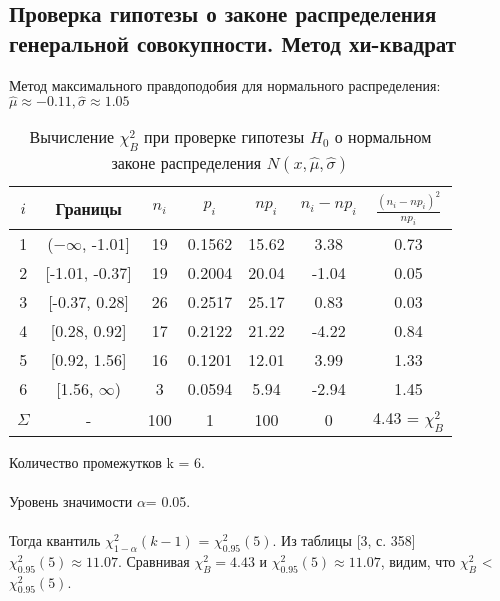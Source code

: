\documentclass[12pt,a4paper]{scrartcl}
\begin{document}
\subsection{Проверка гипотезы о законе распределения генеральной совокупности. Метод хи-квадрат}

	Метод максимального правдоподобия для нормального распределения:
	\newline
	$\hat{\mu} \approx -0.11, \hat{\sigma} \approx 1.05$
	
	\begin{table}[H]
	    \centering
	    \begin{tabular}{| c | c | c | c | c | c | c |}
    \hline
  $ i$ & Границы          &   $n_i$ &   $ p_i$ &   $np_i$ &  $ n_i - np_i$ &  $ \frac{(n_i - np_i)^2}{np_i} $ \\
\hline
   1 & ($-\infty$, -1.01] &    19 & 0.1562 &  15.62 &         3.38 &                          0.73 \\  \hline
   2 & [-1.01, -0.37]  &    19 & 0.2004 &  20.04 &        -1.04 &                          0.05 \\  \hline
   3 & [-0.37, 0.28]   &    26 & 0.2517 &  25.17 &         0.83 &                          0.03 \\  \hline
   4 & [0.28, 0.92]    &    17 & 0.2122 &  21.22 &        -4.22 &                          0.84 \\  \hline
   5 & [0.92, 1.56]    &    16 & 0.1201 &  12.01 &         3.99 &                          1.33 \\  \hline
   6 & [1.56, $\infty$)  &     3 & 0.0594 &   5.94 &        -2.94 &                          1.45 \\  \hline
  $ \Sigma $& -               &   100 & 1      & 100    &         0    & 4.43 = $\chi^{2}_B$ \\  \hline
\end{tabular}
	    \caption{ Вычисление $\chi^{2}_{B}$ при проверке гипотезы $H_{0}$ о нормальном законе распределения $N(x,\hat{\mu}, \hat{\sigma})$}
	    \label{tab:chi_2}
\end{table}
Количество промежутков k = 6.
    \\ \\
Уровень значимости $\alpha$= 0.05.
    \\ \\
    Тогда квантиль $\chi^{2}_{1-\alpha}(k-1)$ = $\chi^{2}_{0.95}(5)$. Из таблицы [3, с. 358] $\chi^{2}_{0.95}(5) \approx 11.07$. 
Сравнивая $\chi^{2}_{B} = 4.43$ и $\chi^{2}_{0.95}(5) \approx 11.07$, видим, что $\chi^{2}_{B}$ < $\chi^{2}_{0.95}(5)$.
\end{document}
